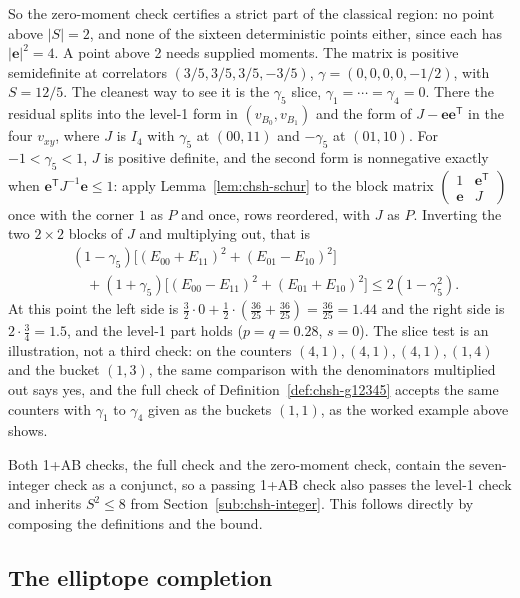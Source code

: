 \documentclass[11pt,twoside]{article}
\theoremstyle{thielethm}
\theoremstyle{thieledef}
\theoremstyle{thieledef}
\theoremstyle{thieledef}
\theoremstyle{thielethm}
\theoremstyle{thieleobs}
\theoremstyle{thielethm}
\begin{document}
So the zero-moment check certifies a strict part of the classical region: no point
above $|S| = 2$, and none of the sixteen deterministic points either, since each has
$|\mathbf e|^2 = 4$. A point above 2 needs supplied moments.
The matrix is positive semidefinite at correlators $(3/5, 3/5, 3/5, -3/5)$,
$\gamma = (0,0,0,0,-1/2)$, with $S = 12/5$. The cleanest way to see it is the $\gamma_5$ slice,
$\gamma_1 = \cdots = \gamma_4 = 0$. There the residual splits into the level-1 form in
$(v_{B_0}, v_{B_1})$ and the form of $J - \mathbf e\mathbf e^{\mathsf T}$ in the four $v_{xy}$,
where $J$ is $I_4$ with $\gamma_5$ at $(00, 11)$ and $-\gamma_5$ at $(01, 10)$. For
$-1 < \gamma_5 < 1$, $J$ is positive definite, and the second form is nonnegative exactly when
$\mathbf e^{\mathsf T} J^{-1} \mathbf e \le 1$: apply Lemma~\ref{lem:chsh-schur} to the block
matrix $\begin{pmatrix} 1 & \mathbf e^{\mathsf T} \\ \mathbf e & J \end{pmatrix}$ once with the corner
$1$ as $P$ and once, rows reordered, with $J$ as $P$. Inverting the two $2 \times 2$ blocks of $J$ and multiplying out, that is
\[
\begin{aligned}
&(1 - \gamma_5)\bigl[(E_{00} + E_{11})^2 + (E_{01} - E_{10})^2\bigr] \\
&\quad + (1 + \gamma_5)\bigl[(E_{00} - E_{11})^2 + (E_{01} + E_{10})^2\bigr]
\le 2(1 - \gamma_5^2).
\end{aligned}
\]
At this point the left side is $\tfrac32 \cdot 0 + \tfrac12 \cdot (\tfrac{36}{25} +
\tfrac{36}{25}) = \tfrac{36}{25} = 1.44$ and the right side is $2 \cdot \tfrac34 = 1.5$, and the
level-1 part holds ($p = q = 0.28$, $s = 0$). The slice test is an illustration, not a third
check: on the counters $(4,1), (4,1), (4,1), (1,4)$ and the bucket $(1,3)$, the same comparison
with the denominators multiplied out says yes, and the full check of
Definition~\ref{def:chsh-g12345} accepts the same counters with $\gamma_1$ to $\gamma_4$ given as
the buckets $(1,1)$, as the worked example above shows.

Both 1+AB checks, the full check and the zero-moment check, contain
the seven-integer check as a conjunct, so a passing 1+AB check also passes the
level-1 check and inherits $S^2 \le 8$ from Section~\ref{sub:chsh-integer}. This follows directly by composing the definitions and the bound.

\subsection{The elliptope completion}
\end{document}
